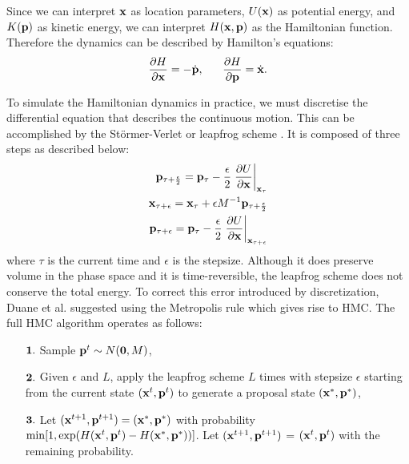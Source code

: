 \documentclass{article} %
\begin{document}
Since we can interpret ${\bf x}$ as location parameters, $U({\bf x})$ as potential energy, and $K({\bf p})$ as kinetic energy, we can interpret $H({\bf x}, {\bf p})$ as the Hamiltonian function. Therefore the dynamics can be described by Hamilton's equations:
\begin{equation} 
 \frac{\partial H}{\partial {\bf x}} = -\dot{{\bf p}}, \mbox{\space \space \space \space \space} \frac{\partial H}{\partial {\bf p}} = \dot{{\bf x}}.
\end{equation}

To simulate the Hamiltonian dynamics in practice, we must discretise the differential equation that describes the continuous motion. This can be accomplished by the St\"{o}rmer-Verlet or leapfrog scheme \cite{leimkuhler2004simulating}. It is composed of three steps as described below:
\begin{eqnarray} 
 {\bf p}_{\tau + \frac{\epsilon}{2}} = {\bf p}_{\tau} - \frac{\epsilon}{2}\left. \frac{\partial U}{\partial {\bf x}}\right|_{{\bf x}_{\tau}}\\
 {\bf x}_{\tau + \epsilon} = {\bf x}_{\tau} + \epsilon M^{-1}{\bf p}_{\tau + \frac{\epsilon}{2}} \\
 {\bf p}_{\tau + \epsilon} = {\bf p}_{\tau} - \frac{\epsilon}{2}\left. \frac{\partial U}{\partial {\bf x}}\right|_{{\bf x}_{\tau + \epsilon}}
\end{eqnarray}
where $\tau$ is the current time and $\epsilon$ is the stepsize. Although it does preserve volume in the phase space and it is time-reversible, the leapfrog scheme does not conserve the total energy. To correct this error introduced by discretization, Duane et al. suggested using the Metropolis rule \cite{duane1987hybrid} which gives rise to HMC. The full HMC algorithm operates as follows:
\begin{itemize}
 \item[${\bf 1.}$]Sample ${\bf p}^{t} \sim N({\bf 0}, M)$,
 \item[${\bf 2.}$]Given $\epsilon$ and $L$, apply the leapfrog scheme $L$ times with stepsize $\epsilon$ starting from the current state $({\bf x}^{t},{\bf p}^{t})$ to generate a proposal state $({\bf x}^{*},{\bf p}^{*})$,
 \item[${\bf 3.}$]Let $({\bf x}^{t+1},{\bf p}^{t+1}) = ({\bf x}^{*},{\bf p}^{*})$ with probability $\min[1, \exp(H({\bf x}^{t},{\bf p}^{t}) - H({\bf x}^{*},{\bf p}^{*}))]$. Let $({\bf x}^{t+1},{\bf p}^{t+1})$ = $({\bf x}^{t},{\bf p}^{t})$ with the remaining probability.
\end{itemize}
\end{document}
